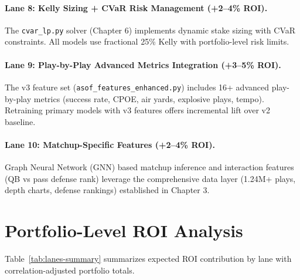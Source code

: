\paragraph{Lane 8: Kelly Sizing + CVaR Risk Management (+2--4\% ROI).}
The \texttt{cvar\_lp.py} solver (Chapter 6) implements dynamic stake sizing with CVaR constraints. All models use fractional 25\% Kelly with portfolio-level risk limits.

\paragraph{Lane 9: Play-by-Play Advanced Metrics Integration (+3--5\% ROI).}
The v3 feature set (\texttt{asof\_features\_enhanced.py}) includes 16+ advanced play-by-play metrics (success rate, CPOE, air yards, explosive plays, tempo). Retraining primary models with v3 features offers incremental lift over v2 baseline.

\paragraph{Lane 10: Matchup-Specific Features (+2--4\% ROI).}
Graph Neural Network (GNN) based matchup inference and interaction features (QB vs pass defense rank) leverage the comprehensive data layer (1.24M+ plays, depth charts, defense rankings) established in Chapter 3.

\section{Portfolio-Level ROI Analysis}

Table~\ref{tab:lanes-summary} summarizes expected ROI contribution by lane with correlation-adjusted portfolio totals.

